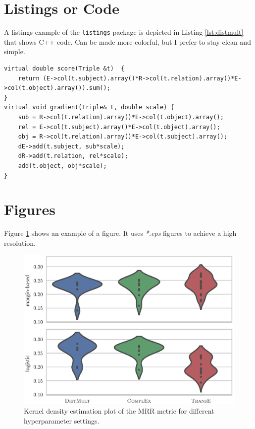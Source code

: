 \section{Listings or Code}
\label{sec:listings}
A listings example of the \texttt{listings} package is depicted in Listing \ref{lst:distmult} that shows C++ code. Can be made more colorful, but I prefer to stay clean and simple.

\begin{lstlisting}
virtual double score(Triple &t)  {
	return (E->col(t.subject).array()*R->col(t.relation).array()*E->col(t.object).array()).sum();
}
virtual void gradient(Triple& t, double scale) {
	sub = R->col(t.relation).array()*E->col(t.object).array();
	rel = E->col(t.subject).array()*E->col(t.object).array();
	obj = R->col(t.relation).array()*E->col(t.subject).array();
	dE->add(t.subject, sub*scale);
	dR->add(t.relation, rel*scale);
	add(t.object, obj*scale);
}
\end{lstlisting}

\section{Figures}
\label{sec:figures}
Figure \ref{fig:hyperparameter-sensitivity-02} shows an example of a figure. It uses \textit{*.eps} figures to achieve a high resolution.

\begin{figure}[h]
	\centering
		\includegraphics[width=\textwidth]{./img/hyperparameter-sensitivity.eps}
	\caption{Kernel density estimation plot of the \acs{MRR} metric for different hyperparameter settings.}
	\label{fig:hyperparameter-sensitivity-02}
\end{figure}

